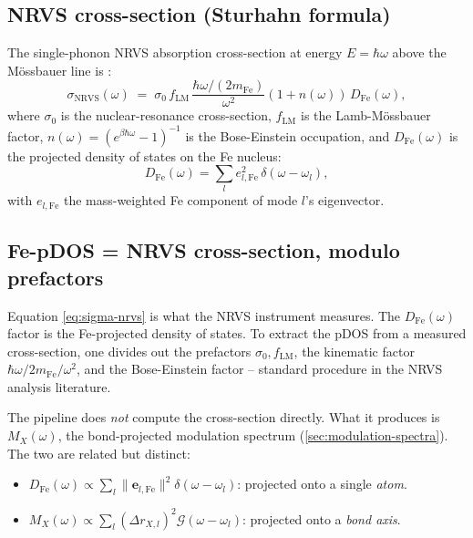 \documentclass[10pt,a4paper,twoside]{article}
\newcommand{\evec}{\mathbf{e}}
\begin{document}
\subsection{NRVS cross-section (Sturhahn formula)}

The single-phonon NRVS absorption cross-section at energy
$E = \hbar\omega$ above the Mössbauer line is \cite{Sturhahn2004}:
\begin{equation}
  \sigma_\text{NRVS}(\omega)
   \;=\; \sigma_0\,f_\text{LM}\,\frac{\hbar\omega/(2 m_\text{Fe})}
                                 {\omega^2}
         (1 + n(\omega))\,D_\text{Fe}(\omega),
  \label{eq:sigma-nrvs}
\end{equation}
where $\sigma_0$ is the nuclear-resonance cross-section,
$f_\text{LM}$ is the Lamb-Mössbauer factor,
$n(\omega) = (e^{\beta\hbar\omega} - 1)^{-1}$ is the
Bose-Einstein occupation, and $D_\text{Fe}(\omega)$ is the
projected density of states on the Fe nucleus:
\begin{equation}
  D_\text{Fe}(\omega) = \sum_l e_{l,\text{Fe}}^2\,
                               \delta(\omega - \omega_l),
  \label{eq:pdos-fe}
\end{equation}
with $e_{l,\text{Fe}}$ the mass-weighted Fe component of mode $l$'s
eigenvector.

\subsection{Fe-pDOS = NRVS cross-section, modulo prefactors}

Equation \cref{eq:sigma-nrvs} is what the NRVS instrument
measures. The $D_\text{Fe}(\omega)$ factor is the Fe-projected
density of states. To extract the pDOS from a measured
cross-section, one divides out the prefactors $\sigma_0,
f_\text{LM}$, the kinematic factor $\hbar\omega/2 m_\text{Fe}/\omega^2$,
and the Bose-Einstein factor -- standard procedure in the NRVS
analysis literature.

The pipeline does \emph{not} compute the cross-section directly.
What it produces is $M_X(\omega)$, the bond-projected modulation
spectrum (\cref{sec:modulation-spectra}). The two are related
but distinct:

\begin{itemize}
  \item $D_\text{Fe}(\omega) \propto \sum_l \lVert\evec_{l,\text{Fe}}
        \rVert^2 \delta(\omega - \omega_l)$: projected onto a
        single \emph{atom}.
  \item $M_X(\omega) \propto \sum_l (\Delta r_{X,l})^2
        \mathcal{G}(\omega - \omega_l)$: projected onto a
        \emph{bond axis}.
\end{itemize}
\end{document}
